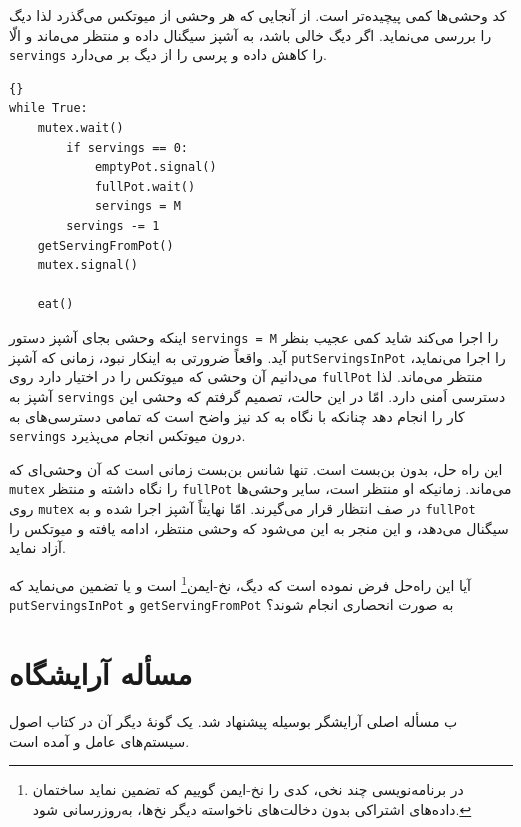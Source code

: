 \documentclass{book}
\newcommand{\clearemptydoublepage}{\newpage\cleardoublepage}
\begin{document}
    کد وحشی‌ها کمی پیچیده‌تر است. از آنجایی که هر وحشی از میوتکس می‌گذرد لذا دیگ را بررسی می‌نماید. 
    اگر دیگ خالی باشد، به آشپز سیگنال داده و منتظر می‌ماند و الّا  {\tt servings} را کاهش داده و پرسی را از دیگ بر می‌دارد. 

\begin{latin}
\begin{lstlisting}[title=\rl{راه‌‌حل غذاخوردن وحشی‌ها (وحشی)}]{}
while True:
    mutex.wait()
        if servings == 0:
            emptyPot.signal()
            fullPot.wait()
            servings = M
        servings -= 1
	getServingFromPot()
    mutex.signal()

    eat()
\end{lstlisting}
\end{latin}

    اینکه وحشی بجای آشپز دستور {\tt servings = M} را اجرا می‌کند شاید کمی عجیب بنظر آید. 
    واقعاً ضرورتی به اینکار نبود، زمانی که 
    آشپز {\tt putServingsInPot} را اجرا می‌نماید، می‌دانیم آن وحشی که میوتکس را در اختیار دارد 
    روی {\tt fullPot} منتظر می‌ماند. 
    لذا آشپز به  {\tt servings} دسترسی اَمنی دارد.  
    امّا در این حالت،‌ تصمیم گرفتم که وحشی این کار را انجام دهد چنانکه با نگاه به کد نیز 
    واضح است که تمامی دسترسی‌های به  {\tt servings} درون میوتکس انجام می‌پذیرد. 
    

    این راه حل، بدون بن‌بست است. 
    تنها شانس بن‌بست زمانی است که آن وحشی‌ای که {\tt mutex}  را نگاه داشته و منتظر {\tt fullPot} می‌ماند. 
    زمانیکه او منتظر است، سایر وحشی‌ها روی {\tt mutex} در صف انتظار قرار می‌گیرند. 
    امّا نهایتاً آشپز اجرا شده و به {\tt fullPot} سیگنال می‌دهد، 
    و این منجر به این می‌شود که  وحشی منتظر، ادامه یافته و میوتکس را آزاد نماید. 
    

    آیا این راه‌حل فرض نموده است که دیگ، نخ-ایمن\footnote{%
    در برنامه‌نویسی چند نخی، کدی را نخ-ایمن گوییم که تضمین نماید ساختمان داده‌های اشتراکی 
    بدون دخالت‌های ناخواسته دیگر نخ‌ها، به‌روزرسانی شود.%
    }  است و یا تضمین می‌نماید که  {\tt putServingsInPot} و {\tt getServingFromPot} 
    به صورت انحصاری انجام شوند؟


\clearemptydoublepage
\section{مسأله آرایشگاه}

ب    مسأله اصلی آرایشگر بوسیله  پیشنهاد شد. 
    یک گونهٔ دیگر آن در کتاب اصول سیستم‌های عامل  و 
    آمده است\cite{silberschatz}. 
\end{document}
